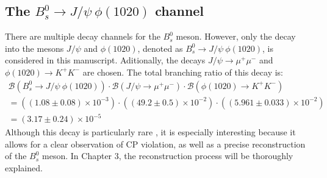 \subsection{The $B^0_s \to J/\psi \ \phi(1020)$ channel}
\label{subsec:channel}
There are multiple decay channels for the $B^0_s$ meson. However, only the decay into the mesons $J/\psi$ and $\phi(1020)$, denoted as $B^0_s \to J/\psi \ \phi(1020)$, is considered in this manuscript. Aditionally, the decays $J/\psi \to \mu^{+} \mu^{-}$ and $\phi(1020) \to K^{+} K^{-}$ are chosen. The total branching ratio of this decay is:
\begin{equation}
	\label{eq:br}
	\begin{split}
	\mathcal{B} \left(B^0_s \to J/\psi \ \phi(1020) \right) \cdot	\mathcal{B} \left(J/\psi \to \mu^{+} \mu^{-} \right) \cdot \mathcal{B} \left(\phi(1020) \to K^{+} K^{-} \right)  \\
	 = ((1.08 \pm 0.08) \times 10^{-3}) \cdot ((49.2 \pm 0.5) \times 10^{-2}) \cdot ((5.961 \pm 0.033) \times 10^{-2}) \\ = (3.17 \pm 0.24) \times 10^{-5}
	\end{split}
\end{equation}
Although this decay is particularly rare \cite{bragagnolo2021measurement}, it is especially interesting because it allows for a clear observation of CP violation, as well as a precise reconstruction of the $B^0_s$ meson. In Chapter 3, the reconstruction process will be thoroughly explained.